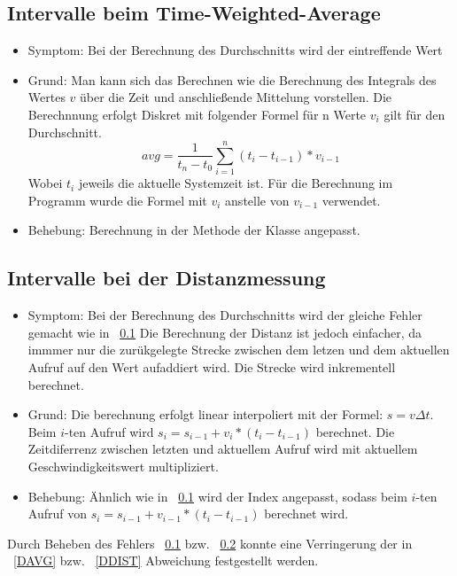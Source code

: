 \documentclass[qualitaetssicherung.tex]{subfiles}
\begin{document}
	\subsection{Intervalle beim Time-Weighted-Average} \label{TWA}
		\begin{itemize}
			\item
			Symptom: Bei der Berechnung des Durchschnitts wird der eintreffende Wert 
			\item
			Grund: Man kann sich das Berechnen wie die Berechnung des Integrals des Wertes $v$ über die Zeit und anschließende Mittelung vorstellen. Die Berechnnung erfolgt Diskret mit folgender Formel für n Werte $v_i$ gilt für den Durchschnitt.
			$$avg = \frac{1}{t_n - t_0} \sum_{i = 1}^{n} (t_i - t_{i-1}) * v_{i-1}$$ Wobei $t_i$ jeweils die aktuelle Systemzeit ist. Für die Berechnung im Programm wurde die Formel mit $v_i$ anstelle von $v_{i-1}$ verwendet.
			\item
			Behebung: Berechnung in der Methode  der Klasse  angepasst.

		\end{itemize}

	\subsection{Intervalle bei der Distanzmessung} \label{VGL}
		\begin{itemize}
			\item
			Symptom: Bei der Berechnung des Durchschnitts wird der gleiche Fehler gemacht wie in ~\ref{TWA} Die Berechnung der Distanz ist jedoch einfacher, da immmer nur die zurükgelegte Strecke zwischen dem letzen und dem aktuellen Aufruf auf den Wert aufaddiert wird. Die Strecke wird inkrementell berechnet.
			\item
			Grund: Die berechnung erfolgt linear interpoliert mit der Formel: $s=v\Delta t$. Beim $i$-ten Aufruf wird $s_{i} = s_{i-1} + v_i * (t_i - t_{i-1})$ berechnet. Die Zeitdiferrenz zwischen letzten und aktuellem Aufruf wird mit aktuellem Geschwindigkeitswert multipliziert.
			\item
			Behebung: Ähnlich wie in ~\ref{TWA} wird der Index angepasst, sodass beim $i$-ten Aufruf von  $s_{i} = s_{i-1} + v_{i-1} * (t_i - t_{i-1})$ berechnet wird.

		\end{itemize}

	Durch Beheben des Fehlers ~\ref{TWA} bzw. ~\ref{VGL} konnte eine Verringerung der in ~\ref{DAVG} bzw. ~\ref{DDIST} Abweichung festgestellt werden.
\end{document}
